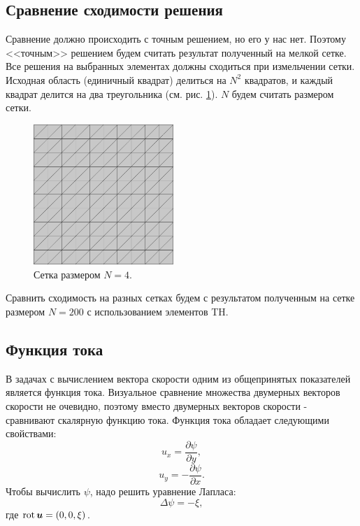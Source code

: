\documentclass[12pt]{article}
\newcommand{\rot}{\mathop{\rm rot}\nolimits}
\begin{document}
\subsection{Сравнение сходимости решения}
Сравнение должно происходить с точным решением, но его у нас нет. Поэтому <<точным>> решением будем считать результат полученный на мелкой сетке. Все решения на выбранных элементах должны сходиться при измельчении сетки. Исходная область (единичный квадрат) делиться на $N^2$ квадратов, и каждый квадрат делится на два треугольника (см. рис. \ref{fg:mesh}). $N$ будем считать размером сетки.

\begin{figure}
	\begin{center}
		\includegraphics[width=200px]{pics/mesh}
		\caption{Сетка размером $N=4$.}
		\label{fg:mesh}
	\end{center}
\end{figure}

Сравнить сходимость на разных сетках будем с результатом полученным на сетке размером $N=200$ с использованием элементов TH. 

\subsection{Функция тока}
В задачах с вычислением вектора скорости одним из общепринятых показателей является функция тока. Визуальное сравнение множества двумерных векторов скорости не очевидно, поэтому вместо двумерных векторов скорости - сравнивают скалярную функцию тока. Функция тока обладает следующими свойствами:
\begin{equation}
u_x = \frac{\partial \psi}{\partial y},
\end{equation}
\begin{equation}
u_y = - \frac{\partial \psi}{\partial x}.
\end{equation}
Чтобы вычислить $\psi$, надо решить уравнение Лапласа:
\begin{equation}
\Delta\psi=-\xi,
\end{equation}
где $\rot {\bm u} = (0, 0, \xi)$.
\end{document}
